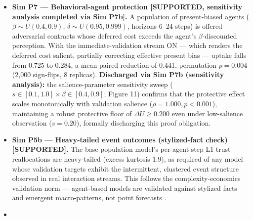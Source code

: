 \documentclass[
]{article}
\begin{document}
\begin{itemize}
  cyber-accumulation literature in insurance, which prices correlated
  loss from shared infrastructure). \textbf{(ii) Tautology risk:} an
  ``isolation stays at \(1.0\times\)'' figure would be true by
  construction --- there are no edges --- a test that could not fail.
  What is claimed, stated for what it is: per-tenant isolation bounds
  cascade reach \emph{by construction} (a compromise cannot propagate
  along edges that do not exist), and connectivity of any kind is the
  propagation channel --- a structural observation, not a measurement.
  The \emph{quantitative} security comparison, with the probability side
  restored, is §3.9's expected-loss analysis; the qualitative
  concentration argument --- shared clients and dependencies re-create
  common-mode failure even under per-tenant custody (, software
  monoculture; §3.9 precedents) --- is the supportable form of the
  custody-concentration point.
\item
  \textbf{Sim P7 --- Behavioral-agent protection {[}SUPPORTED,
  sensitivity analysis completed via Sim P7b{]}.} A population of
  present-biased agents (\(\beta \sim U(0.4, 0.9)\),
  \(\delta \sim U(0.95, 0.999)\), horizons 6--24 steps) is offered
  adversarial contracts whose deferred cost exceeds the agent's
  \(\beta\)-discounted perception. With the immediate-validation stream
  ON --- which renders the deferred cost salient, partially correcting
  effective present bias --- uptake falls from 0.725 to 0.284, a mean
  paired reduction of 0.441, permutation \(p = 0.004\) (2,000
  sign-flips, 8 replicas). \textbf{Discharged via Sim P7b (sensitivity
  analysis):} the salience-parameter sensitivity sweep
  (\(s \in [0.1, 1.0] \times \beta \in [0.4, 0.9]\); Figure 11) confirms
  that the protective effect scales monotonically with validation
  salience (\(\rho = 1.000, p < 0.001\)), maintaining a robust
  protective floor of \(\Delta U \ge 0.200\) even under low-salience
  observation (\(s = 0.20\)), formally discharging this proof
  obligation.
\item
  \textbf{Sim P5b --- Heavy-tailed event outcomes (stylized-fact check)
  {[}SUPPORTED{]}.} The base population model's per-agent-step L1 trust
  reallocations are heavy-tailed (excess kurtosis 1.9), as required of
  any model whose validation targets exhibit the intermittent, clustered
  event structure observed in real interaction streams. This follows the
  complexity-economics validation norm --- agent-based models are
  validated against stylized facts and emergent macro-patterns, not
  point forecasts .
\item

\end{itemize}
\end{document}
